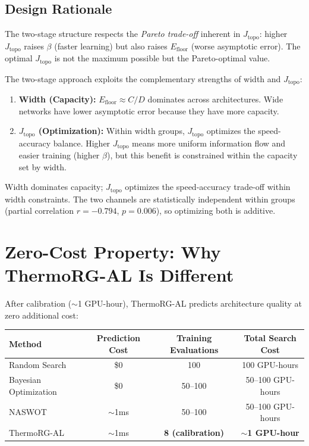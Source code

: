 \documentclass[11pt, a4paper]{article}
\theoremstyle{plain}
\begin{document}
\subsection{Design Rationale}

The two-stage structure respects the \emph{Pareto trade-off} inherent in $J_{\mathrm{topo}}$: higher $J_{\mathrm{topo}}$ raises $\beta$ (faster learning) but also raises $E_{\mathrm{floor}}$ (worse asymptotic error). The optimal $J_{\mathrm{topo}}$ is not the maximum possible but the Pareto-optimal value.

The two-stage approach exploits the complementary strengths of width and $J_{\mathrm{topo}}$:

\begin{enumerate}
\item \textbf{Width (Capacity):} $E_{\mathrm{floor}} \approx C/D$ dominates across architectures. Wide networks have lower asymptotic error because they have more capacity.

\item \textbf{$J_{\mathrm{topo}}$ (Optimization):} Within width groups, $J_{\mathrm{topo}}$ optimizes the speed-accuracy balance. Higher $J_{\mathrm{topo}}$ means more uniform information flow and easier training (higher $\beta$), but this benefit is constrained within the capacity set by width.
\end{enumerate}

Width dominates capacity; $J_{\mathrm{topo}}$ optimizes the speed-accuracy trade-off within width constraints. The two channels are statistically independent within groups (partial correlation $r = -0.794$, $p = 0.006$), so optimizing both is additive.

\section{Zero-Cost Property: Why ThermoRG-AL Is Different}

After calibration ($\sim$1 GPU-hour), ThermoRG-AL predicts architecture quality at zero additional cost:

\begin{center}
\begin{tabular}{lccc}
\toprule
Method & Prediction Cost & Training Evaluations & Total Search Cost \\
\midrule
Random Search & \$0 & 100 & 100 GPU-hours \\
Bayesian Optimization & \$0 & 50--100 & 50--100 GPU-hours \\
NASWOT & $\sim$1ms & 50--100 & 50--100 GPU-hours \\
ThermoRG-AL & $\sim$1ms & \textbf{8 (calibration)} & \textbf{$\sim$1 GPU-hour} \\
\bottomrule
\end{tabular}
\end{center}
\end{document}
